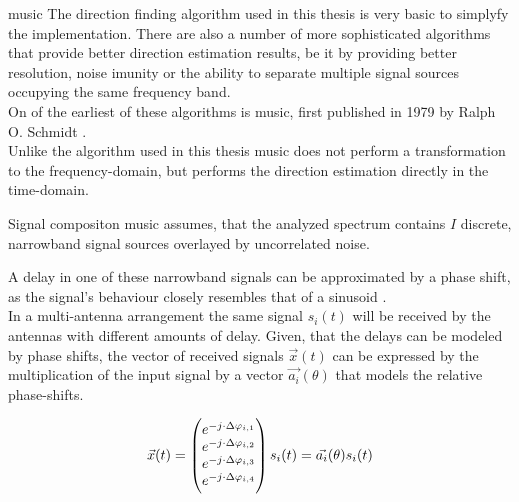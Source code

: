 \begin{subchapter}{\acrshort{music}}
  The direction finding algorithm used in this thesis
  is very basic to simplyfy the implementation.
  There are also a number of more sophisticated algorithms
  that provide better direction estimation results, be it
  by providing better resolution, noise imunity or the
  ability to separate multiple signal sources occupying
  the same frequency band. \\

  On of the earliest of these algorithms is \gls{music},
  first published in 1979 by Ralph O. Schmidt \cite{schmidt1979}. \\

  Unlike the algorithm used in this thesis \gls{music}
  does not perform a transformation to the frequency-domain,
  but performs the direction estimation directly
  in the time-domain. \\

  \begin{subsubchapter}{Signal compositon}
    \gls{music} assumes, that the analyzed spectrum contains
    $I$ discrete, narrowband signal sources overlayed by
    uncorrelated noise.

    A delay in one of these narrowband signals can be approximated
    by a phase shift, as the signal's behaviour closely resembles
    that of a sinusoid \cite[p. 4]{girdmusic}. \\

    In a multi-antenna arrangement the same signal $s_{i}(t)$ will be
    received by the antennas with different amounts of delay.
    Given, that the delays can be modeled by phase shifts,
    the vector of received signals $\vec{x}(t)$ can be expressed
    by the multiplication of the input signal by a vector
    $\vec{a_{i}}(\theta)$ that models the relative phase-shifts.

    \begin{equation}
      \vec{x}(t) =
        \begin{pmatrix}
          e^{-j \cdot \Delta\varphi_{i,1}} \\
          e^{-j \cdot \Delta\varphi_{i,2}} \\
          e^{-j \cdot \Delta\varphi_{i,3}} \\
          e^{-j \cdot \Delta\varphi_{i,4}}
        \end{pmatrix} s_{i}(t) = \\
      \vec{a_{i}}(\theta) s_{i}(t)
    \end{equation}


\end{subsubchapter}
\end{subchapter}
